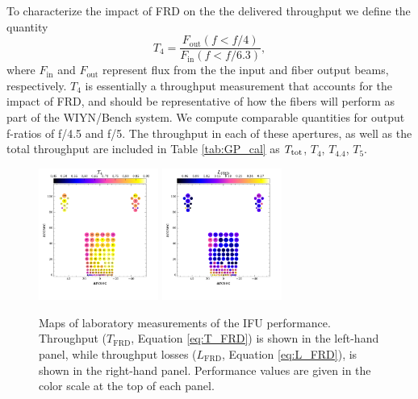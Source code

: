 \begin{appendices}
To characterize the impact of FRD on the the delivered throughput we
define the quantity
\begin{equation}
\label{eq:T_FRD}
  T_{\mathrm{4}} = \frac{F_{\mathrm{out}}(f<f/4)}{F_{\mathrm{in}}(f<f/6.3)},
\end{equation}
where $F_\mathrm{in}$ and $F_\mathrm{out}$ represent flux from the the
input and fiber output beams, respectively. $T_4$ is essentially a
throughput measurement that accounts for the impact of FRD, and should
be representative of how the fibers will perform as part of the
WIYN/Bench system.  We compute comparable quantities for output
f-ratios of f/4.5 and f/5.  The throughput in each of these apertures,
as well as the total throughput are included in Table \ref{tab:GP_cal}
as $T_{\rm tot}$, $T_4$, $T_{4.4}$, $T_{5}$.

\begin{figure}[htb]
  \centering
  \includegraphics[width=0.35\textwidth]{891_1/figs/gradpak_map.pdf}
  \includegraphics[width=0.35\textwidth]{891_1/figs/gradpak_L_map.pdf}
\vskip -0.25in
\caption{\label{fig:TL_FRD}\fixspacing Maps of laboratory measurements
  of the \GP IFU performance. Throughput ($T_{\mathrm{FRD}}$, Equation
  \ref{eq:T_FRD}) is shown in the left-hand panel, while throughput
  losses ($L_{\mathrm{FRD}}$, Equation \ref{eq:L_FRD}), is shown in
  the right-hand panel. Performance values are given in the color
  scale at the top of each panel.}
\end{figure}


\end{appendices}
